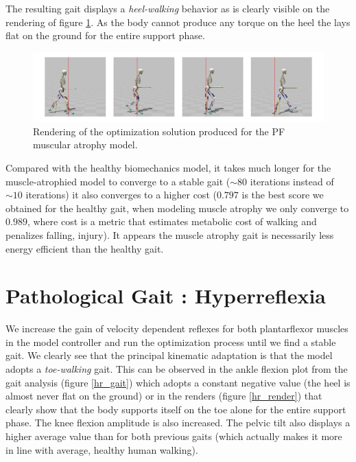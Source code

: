 \documentclass[11pt]{article}
\begin{document}
The resulting gait displays a \textit{heel-walking} behavior as is clearly visible on the rendering of figure \ref{atrophic_render}. As the body cannot produce any torque on the heel the lays flat on the ground for the entire support phase.

\begin{figure}[h!]
    \centering
    \includegraphics[width=\textwidth]{screens/heel_walk.jpg}
    \caption{Rendering of the optimization solution produced for the PF muscular atrophy model.}
    \label{atrophic_render}
\end{figure}

Compared with the healthy biomechanics model, it takes much longer for the muscle-atrophied model to converge to a stable gait ($\sim 80$ iterations instead of $\sim 10$ iterations) it also converges to a higher cost ($0.797$ is the best score we obtained for the healthy gait, when modeling muscle atrophy we only converge to $0.989$, where cost is a metric that estimates metabolic cost of walking and penalizes falling, injury). It appears the muscle atrophy gait is necessarily less energy efficient than the healthy gait.

\section{Pathological Gait : Hyperreflexia}

We increase the gain of velocity dependent reflexes for both plantarflexor muscles in the model controller and run the optimization process until we find a stable gait. We clearly see that the principal kinematic adaptation is that the model adopts a \textit{toe-walking} gait. This can be observed in the ankle flexion plot  from the gait analysis (figure \ref{hr_gait}) which adopts a constant negative value (the heel is almost never flat on the ground) or in the renders (figure \ref{hr_render}) that clearly show that the body supports itself on the toe alone for the entire support phase. The knee flexion amplitude is also increased. The pelvic tilt also displays a higher average value than for both previous gaits (which actually makes it more in line with average, healthy human walking).
\end{document}
